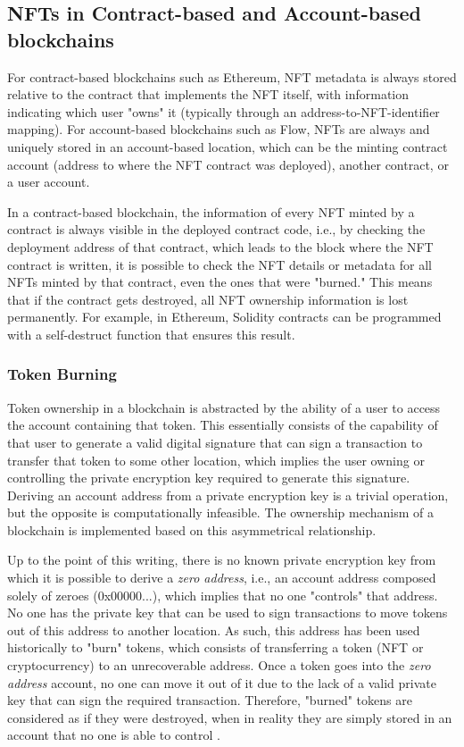 \documentclass[../3_VotingAndNFTs.tex]{subfiles}
\begin{document}
        \subsection{NFTs in Contract-based and Account-based blockchains}
        \label{sec:contract-to-account-storage}
        For contract-based blockchains such as Ethereum, NFT metadata is always stored relative to the contract that implements the NFT itself, with information indicating which user "owns" it (typically through an address-to-NFT-identifier mapping). For account-based blockchains such as Flow, NFTs are always and uniquely stored in an account-based location, which can be the minting contract account (address to where the NFT contract was deployed), another contract, or a user account.
        \par
        In a contract-based blockchain, the information of every NFT minted by a contract is always visible in the deployed contract code, i.e., by checking the deployment address of that contract, which leads to the block where the NFT contract is written, it is possible to check the NFT details or metadata for all NFTs minted by that contract, even the ones that were "burned." This means that if the contract gets destroyed, all NFT ownership information is lost permanently. For example, in Ethereum, Solidity contracts can be programmed with a self-destruct function that ensures this result.
            
            \subsubsection{Token Burning}
            Token ownership in a blockchain is abstracted by the ability of a user to access the account containing that token. This essentially consists of the capability of that user to generate a valid digital signature that can sign a transaction to transfer that token to some other location, which implies the user owning or controlling the private encryption key required to generate this signature. Deriving an account address from a private encryption key is a trivial operation, but the opposite is computationally infeasible. The ownership mechanism of a blockchain is implemented based on this asymmetrical relationship.
            \par
            Up to the point of this writing, there is no known private encryption key from which it is possible to derive a \textit{zero address}, i.e., an account address composed solely of zeroes (0x00000...), which implies that no one "controls" that address. No one has the private key that can be used to sign transactions to move tokens out of this address to another location. As such, this address has been used historically to "burn" tokens, which consists of transferring a token (NFT or cryptocurrency) to an unrecoverable address. Once a token goes into the \textit{zero address} account, no one can move it out of it due to the lack of a valid private key that can sign the required transaction. Therefore, "burned" tokens are considered as if they were destroyed, when in reality they are simply stored in an account that no one is able to control \cite{Antonopoulos2018}.
\end{document}
